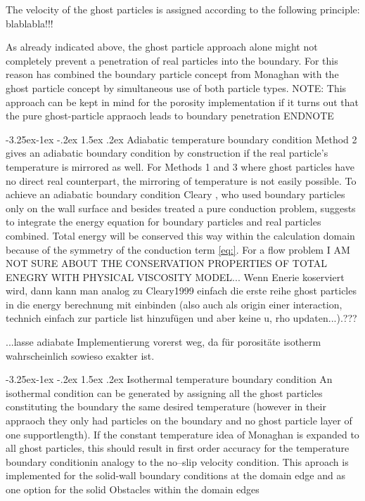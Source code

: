 \documentclass{report}
\makeatletter
\renewcommand\paragraph{\@startsection{paragraph}{4}{\z@}%
  {-3.25ex\@plus -1ex \@minus -.2ex}%
  {1.5ex \@plus .2ex}%
  {\normalfont\normalsize\bfseries}}
\makeatother
\begin{document}
\begin{itemize}
The velocity of the ghost particles is assigned according to the following principle:
blablabla!!!


\end{itemize}


As already indicated above, the ghost particle approach alone might not completely prevent a penetration of real particles into the boundary. For this reason \cite{Liu2002} has combined the boundary particle concept from Monaghan with the ghost particle concept by simultaneous use of both particle types.  NOTE: This approach can be kept in mind for the porosity implementation if it turns out that the pure ghost-particle appraoch leads to boundary penetration ENDNOTE



\paragraph{Adiabatic temperature boundary condition}
Method 2 gives an adiabatic boundary condition by construction if the real particle's temperature is mirrored as well. 
For Methods 1 and 3 where ghost particles have no direct real counterpart, the mirroring of temperature is not easily possible. To achieve an adiabatic boundary condition Cleary \cite{Cleary1999}, who used boundary particles only on the wall surface and besides treated a pure conduction problem, suggests to integrate the energy equation for boundary particles and real particles combined. Total energy will be conserved this way within the calculation domain because of the symmetry of the conduction term \ref{eq:}.
For a flow problem I AM NOT SURE ABOUT THE CONSERVATION PROPERTIES OF TOTAL ENEGRY WITH PHYSICAL VISCOSITY MODEL...
Wenn Enerie koserviert wird, dann kann man analog zu Cleary1999 einfach die erste reihe ghost particles in die energy berechnung mit einbinden (also auch als origin einer interaction, technich einfach zur particle list hinzufügen und aber keine u, rho updaten...).???

...lasse adiabate Implementierung vorerst weg, da für porositäte isotherm wahrscheinlich sowieso exakter ist.

\paragraph{Isothermal temperature boundary condition}
\label{sec:BC_solid_Wall_isothermal}
An isothermal condition can be generated by assigning all the ghost particles constituting the boundary the same desired temperature \cite{Cleary1999} (however in their appraoch they only had particles on the boundary and no ghost particle layer of one supportlength). If the constant temperature idea of Monaghan is expanded to all ghost particles, this should result in first order accuracy for the temperature boundary conditionin analogy to the no--slip velocity condition. This aproach is implemented for the solid-wall boundary conditions at the domain edge and as one option for the solid Obstacles within the domain edges
\end{document}
